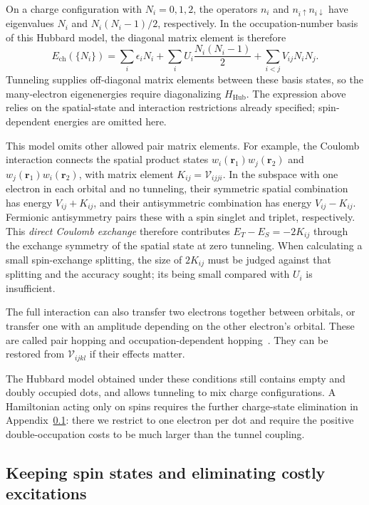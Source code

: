 On a charge configuration with $N_i=0,1,2$, the operators $n_i$
and $n_{i\uparrow}n_{i\downarrow}$ have eigenvalues $N_i$ and
$N_i(N_i-1)/2$, respectively. In the occupation-number basis of
this Hubbard model, the diagonal matrix element is therefore
\begin{equation}
 E_{\mathrm{ch}}(\{N_i\})
   =\sum_i\epsilon_i N_i
    +\sum_i U_i\frac{N_i(N_i-1)}2
    +\sum_{i<j}V_{ij}N_iN_j.
 \label{eq:dot-array-charge-energy}
\end{equation}
Tunneling supplies off-diagonal matrix elements between these basis
states, so the many-electron eigenenergies require diagonalizing
$H_{\mathrm{Hub}}$. The expression above relies on the spatial-state
and interaction restrictions already specified; spin-dependent
energies are omitted here.

This model omits other allowed pair matrix elements. For example,
the Coulomb interaction connects the spatial product states
$w_i(\mathbf r_1)w_j(\mathbf r_2)$ and
$w_j(\mathbf r_1)w_i(\mathbf r_2)$, with matrix element
$K_{ij}=\mathcal V_{ijji}$. In the subspace with one electron
in each orbital and no tunneling, their symmetric spatial
combination has energy $V_{ij}+K_{ij}$, and their antisymmetric
combination has energy $V_{ij}-K_{ij}$.
Fermionic antisymmetry pairs these with a spin singlet and triplet,
respectively. This \emph{direct Coulomb exchange} therefore contributes
$E_T-E_S=-2K_{ij}$ through the exchange symmetry of the spatial
state at zero tunneling. When calculating a small spin-exchange
splitting, the size of $2K_{ij}$ must be judged against that splitting
and the accuracy sought; its being small compared with $U_i$ is
insufficient.

The full interaction can also transfer two electrons together
between orbitals, or transfer one with an amplitude depending on
the other electron's orbital. These are called pair hopping and
occupation-dependent hopping~\cite{Wang2011}. They can be restored
from $\mathcal V_{ijkl}$ if their effects matter.

The Hubbard model obtained under these conditions still contains
empty and doubly occupied dots, and allows tunneling to mix charge
configurations. A Hamiltonian acting only on spins requires the
further charge-state elimination in
Appendix~\ref{sec:device-low-energy-reduction}: there we restrict to
one electron per dot and require the positive double-occupation
costs to be much larger than the tunnel coupling.

\subsection{Keeping spin states and eliminating costly excitations}
\label{sec:device-low-energy-reduction}

